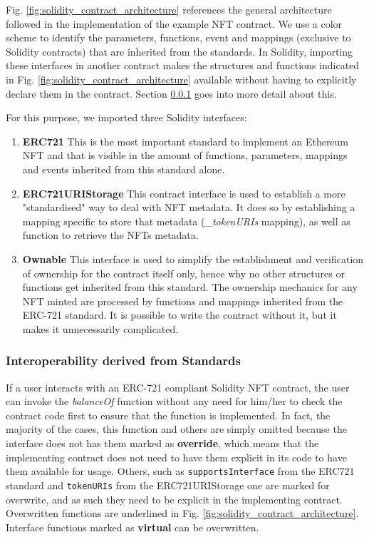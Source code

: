 \documentclass[../main.tex]{subfiles}
\begin{document}
Fig. \ref{fig:solidity_contract_architecture} references the general architecture followed in the implementation of the example NFT contract. We use a color scheme to identify the parameters, functions, event and mappings (exclusive to Solidity contracts) that are inherited from the standards. In Solidity, importing these interfaces in another contract makes the structures and functions indicated in Fig. \ref{fig:solidity_contract_architecture} available without having to explicitly declare them in the contract. Section \ref{sec:interoperability_functions} goes into more detail about this.

For this purpose, we imported three Solidity interfaces:
\begin{enumerate}
    \item {\textbf{ERC721}} This is the most important standard to implement an Ethereum NFT and that is visible in the amount of functions, parameters, mappings and events inherited from this standard alone.
    \item {\textbf{ERC721URIStorage}} This contract interface is used to establish a more "standardised" way to deal with NFT metadata. It does so by establishing a mapping specific to store that metadata (\textit{\_tokenURIs} mapping), as well as function to retrieve the NFTs metadata.
    \item {\textbf{Ownable}} This interface is used to simplify the establishment and verification of ownership for the contract itself only, hence why no other structures or functions get inherited from this standard. The ownership mechanics for any NFT minted are processed by functions and mappings inherited from the ERC-721 standard. It is possible to write the contract without it, but it makes it unnecessarily complicated.
\end{enumerate}

\subsubsection{Interoperability derived from Standards}
\label{sec:interoperability_functions}
If a user interacts with an ERC-721 compliant Solidity NFT contract, the user can invoke the \textit{balanceOf} function without any need for him/her to check the contract code first to ensure that the function is implemented. In fact, the majority of the cases, this function and others are simply omitted because the interface does not has them marked as \textbf{override}, which means that the implementing contract does not need to have them explicit in its code to have them available for usage. Others, such as \verb|supportsInterface| from the ERC721 standard and \verb|tokenURIs| from the ERC721URIStorage one are marked for overwrite, and as such they need to be explicit in the implementing contract. Overwritten functions are underlined in Fig. \ref{fig:solidity_contract_architecture}. Interface functions marked as \textbf{virtual} can be overwritten.
\end{document}
